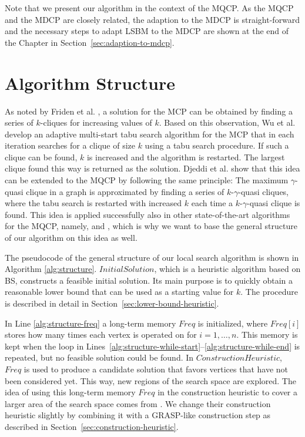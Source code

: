 \documentclass[draft,final]{vutinfth} %
\begin{document}
Note that we present our algorithm in the context of the MQCP. As the MQCP and the MDCP are closely related, the adaption to the MDCP is straight-forward and the necessary steps to adapt LSBM to the MDCP are shown at the end of the Chapter in Section~\ref{sec:adaption-to-mdcp}. 

\section{Algorithm Structure} \label{sec:algorithm-structure}

As noted by Friden et al. \cite{Friden1989}, a solution for the MCP can be obtained by finding a series of $k$-cliques for increasing values of $k$. Based on this observation, Wu et al. \cite{WuH13} develop an adaptive multi-start tabu search algorithm for the MCP that in each iteration searches for a clique of size $k$ using a tabu search procedure. If such a clique can be found, $k$ is increased and the algorithm is restarted. The largest clique found this way is returned as the solution. Djeddi et al. \cite{djeddi_extension_2019} show that this idea can be extended to the MQCP by following the same principle: The maximum $\gamma$-quasi clique in a graph is approximated by finding a series of $k$-$\gamma$-quasi cliques, where the tabu search is restarted with increased $k$ each time a $k$-$\gamma$-quasi clique is found. This idea is applied successfully also in other state-of-the-art algorithms for the MQCP, namely, \cite{zhou_opposition-based_2020} and \cite{chen_nuqclq_2021}, which is why we want to base the general structure of our algorithm on this idea as well. 

The pseudocode of the general structure of our local search algorithm is shown in Algorithm \ref{alg:structure}.
$\mathit{InitialSolution}$, which is a heuristic algorithm based on BS, constructs a feasible initial solution. Its main purpose is to quickly obtain a reasonable lower bound that can be used as a starting value for $k$. The procedure is described in detail in Section~\ref{sec:lower-bound-heuristic}.

In Line \ref{alg:structure-freq} a long-term memory $\mathit{Freq}$ is initialized, where $\mathit{Freq[i]}$ stores how many times each vertex is operated on for $i=1,\dots,n$. This memory is kept when the loop in Lines~\ref{alg:structure-while-start}--\ref{alg:structure-while-end} is repeated, but no feasible solution could be found. In $\mathit{ConstructionHeuristic}$, $\mathit{Freq}$ is used to produce a candidate solution that favors vertices that have not been considered yet. This way, new regions of the search space are explored. The idea of using this long-term memory $\mathit{Freq}$ in the construction heuristic to cover a larger area of the search space comes from \cite{chen_nuqclq_2021}. We change their construction heuristic slightly by combining it with a GRASP-like construction step as described in Section~\ref{sec:construction-heuristic}. 
\end{document}
